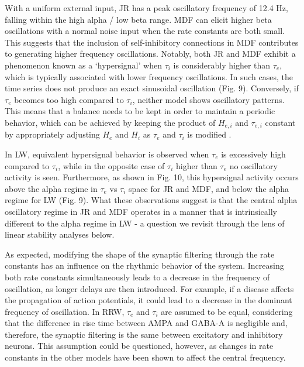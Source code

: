 \documentclass[12pt,twoside]{article}
\begin{document}
With a uniform external input, JR has a peak oscillatory frequency of 12.4 Hz, falling within the high alpha / low beta range. MDF can elicit higher beta oscillations with a normal noise input when the rate constants are both small. This suggests that the inclusion of self-inhibitory connections in MDF contributes to generating higher frequency oscillations. Notably, both JR and MDF exhibit a phenomenon known as a `hypersignal' \citep{david2003neural} when $\tau_i$ is considerably higher than $\tau_e$, which is typically associated with lower frequency oscillations. In such cases, the time series does not produce an exact sinusoidal oscillation (Fig. 9). Conversely, if $\tau_e$ becomes too high compared to $\tau_i$, neither model shows oscillatory patterns. This means that a balance needs to be kept in order to maintain a periodic behavior, which can be achieved by keeping the product of $H_{e,i}$ and $\tau_{e,i}$ constant by appropriately adjusting $H_e$ and $H_i$ as $\tau_e$ and $\tau_i$ is modified \citep{david2003neural}. 

In LW, equivalent hypersignal behavior is observed when $\tau_e$ is excessively high compared to $\tau_i$, while in the opposite case of $\tau_i$ higher than $\tau_e$ no oscillatory activity is seen. Furthermore, as shown in Fig. 10, this hypersignal activity occurs above the alpha regime in $\tau_e$ vs $\tau_i$ space for JR and MDF, and below the alpha regime for LW (Fig. 9). What these observations suggest is that the central alpha oscillatory regime in JR and MDF operates in a manner that is intrinsically different to the alpha regime in LW - a question we revisit through the lens of linear stability analyses below. 

As expected, modifying the shape of the synaptic filtering through the rate constants has an influence on the rhythmic behavior of the system. Increasing both rate constants simultaneously leads to a decrease in the frequency of oscillation, as longer delays are then introduced. For example, if a disease affects the propagation of action potentials, it could lead to a decrease in the dominant frequency of oscillation.
In RRW, $\tau_{e}$ and $\tau_{i}$ are assumed to be equal, considering that the difference in rise time between AMPA and GABA-A is negligible and, therefore, the synaptic filtering is the same between excitatory and inhibitory neurons. This assumption could be questioned, however, as changes in rate constants in the other models have been shown to affect the central frequency. 
\end{document}
